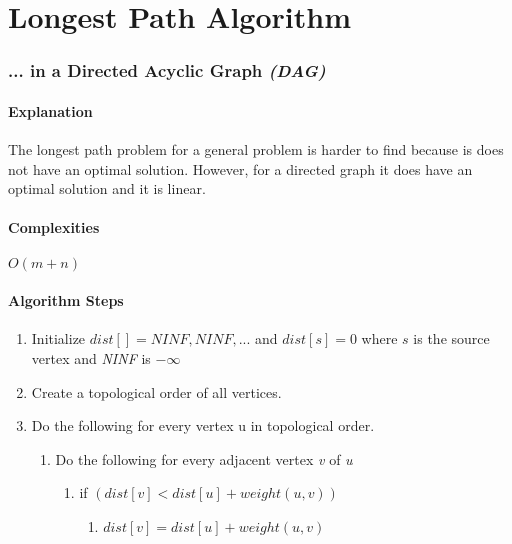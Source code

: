 \documentclass[]{article}
\begin{document}
\part{Longest Path Algorithm}

\section{... in a Directed Acyclic Graph \textit{(DAG)} }
	\subsection{Explanation}
	\par The longest path problem for a general problem is harder to find because is does not have an optimal solution. However, for a directed graph it does have an optimal solution and it is linear.
	
	\subsection{Complexities}
	\par $O(m + n)$
	
	\subsection{Algorithm Steps}
	\begin{enumerate}
		\item Initialize $dist[] = {NINF, NINF,...}$ and $dist[s] = 0$ where $s$ is the source vertex and \textit{NINF} is $-\infty$
		\item Create a topological order of all vertices.
		\item Do the following for every vertex u in topological order.
		\begin{enumerate}
			\item Do the following for every adjacent vertex \textit{v} of \textit{u}
			\begin{enumerate}
				\item if $(dist[v] < dist[u] + weight(u,v))$
				\begin{enumerate}
					\item $dist[v] = dist[u] + weight(u,v)$
				\end{enumerate}
			\end{enumerate}
		\end{enumerate}
	\end{enumerate}


\newpage
\nocite{*}
\printbibliography
\end{document}
